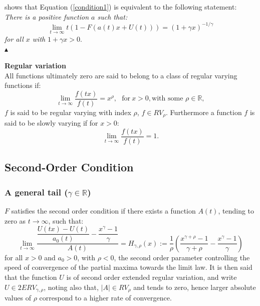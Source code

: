 \cite{de1984slow} shows that Equation (\ref{condition1}) is equivalent to the following statement:\\
{\it There is a positive function $a$ such that:}
\begin{equation}\label{condition1b}
\lim_{t\rightarrow\infty} t(1-F(a(t)x + U(t))) = (1+\gamma x)^{-1/\gamma}
\end{equation}{\it for all $x$ with }$1+\gamma x >0$.\\
\hspace*{\fill}$\blacktriangle$

\begin{definition}\textnormal{\textbf{Regular variation}} \\
	All functions ultimately zero are said to belong to a class of regular varying functions if:\begin{equation}
	\lim\limits_{t\rightarrow \infty}\dfrac{f(tx)}{f(t)}=x^{\rho},\ \ \ \text{for}\ x>0, \text{with some } \rho \in \mathbb{R},
	\end{equation}$f$ is said to be regular varying with index $\rho$, $f\in RV_{\rho}$. Furthermore a function $f$ is said to be slowly varying if for $x>0$: \begin{equation}
	\lim\limits_{t\rightarrow \infty}\dfrac{f(tx)}{f(t)}=1.
	\end{equation}
\end{definition}

\subsection*{Second-Order Condition}
\subsubsection*{A general tail ($\gamma\in\mathbb{R}$)}
$F$ satisfies the second order condition if there exists a function $A(t)$, tending to zero as $t\rightarrow\infty$, such that:
\begin{equation}\label{2nd}
\lim\limits_{t\rightarrow\infty}\dfrac{\dfrac{U(tx)-U(t)}{a_0(t)}-\dfrac{x^{\gamma}-1}{\gamma}}{A(t)}=H_{\gamma,\rho}(x):=\dfrac{1}{\rho}\left(\dfrac{x^{\gamma+\rho}-1}{\gamma+\rho}-\dfrac{x^{\gamma}-1}{\gamma}\right)
\end{equation}
for all $x>0$ and $a_0>0$, with $\rho <0$, the second order parameter controlling the speed of convergence of the partial maxima towards the limit law. It is then said that the function $U$ is of second order extended regular variation, and write $U\in 2ERV_{\gamma,\rho}$, noting also that, $|A|\in RV_{\rho}$ and tends to zero, hence larger absolute values of $\rho$ correspond to a higher rate of convergence.

